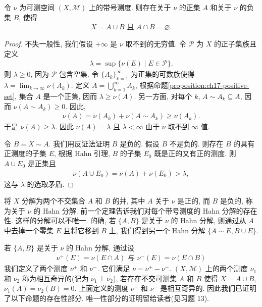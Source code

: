 \documentclass[../../main.tex]{subfiles}
\begin{document}
\begin{theorem}\label{theorem:ch17-hahn-decomposition}
令 $\nu$ 为可测空间 $(X,\mathcal{M})$ 上的带号测度. 则存在关于 $\nu$ 的正集 $A$ 和关于 $\nu$ 的负集 $B$, 使得
\begin{align*}
X=A\cup B\text{ 且 }A\cap B=\varnothing.
\end{align*}
\end{theorem}

\begin{proof}
不失一般性, 我们假设 $+\infty$ 是 $\nu$ 取不到的无穷值. 令 $\mathcal{P}$ 为 $X$ 的正子集族且定义
\begin{align*}
\lambda=\sup\{\nu(E)\mid E\in\mathcal{P}\}.
\end{align*}
则 $\lambda\geqslant 0$, 因为 $\mathcal{P}$ 包含空集. 令 $\{A_{k}\}_{k=1}^{\infty}$ 为正集的可数族使得 $\lambda=\lim_{k\to\infty}\nu(A_{k})$. 定义 $A=\bigcup_{k=1}^{\infty}A_{k}$, 根据命题\cref{proposition:ch17-positive-set}, 集合 $A$ 是一个正集, 因而 $\lambda\geqslant\nu(A)$. 另一方面, 对每个 $k$, $A\sim A_{k}\subseteq A$, 因而 $\nu(A\sim A_{k})\geqslant 0$. 因此,
\begin{align*}
\nu(A)=\nu(A_{k})+\nu(A\sim A_{k})\geqslant\nu(A_{k}).
\end{align*}
于是 $\nu(A)\geqslant\lambda$. 因此 $\nu(A)=\lambda$ 且 $\lambda<\infty$ 由于 $\nu$ 取不到 $\infty$ 值.

令 $B=X\sim A$. 我们用反证法证明 $B$ 是负的. 假设 $B$ 不是负的. 则存在 $B$ 的具有正测度的子集 $E$, 根据 Hahn 引理, $B$ 的子集 $E_{0}$ 既是正的又有正的测度. 则 $A\cup E_{0}$ 是正集且
\begin{align*}
\nu(A\cup E_{0})=\nu(A)+\nu(E_{0})>\lambda,
\end{align*}
这与 $\lambda$ 的选取矛盾.
\end{proof}

将 $X$ 分解为两个不交集合 $A$ 和 $B$ 的并, 其中 $A$ 关于 $\nu$ 是正的, 而 $B$ 是负的, 称为关于 $\nu$ 的 Hahn 分解. 前一个定理告诉我们对每个带号测度的 Hahn 分解的存在性. 这样的分解可以不唯一. 的确, 若 $\{A,B\}$ 是关于 $\nu$ 的 Hahn 分解, 则通过从 $A$ 中去掉一个零集 $E$ 且将它移到 $B$ 上, 我们得到另一个 Hahn 分解 $\{A\sim E,B\cup E\}$.

若 $\{A,B\}$ 是关于 $\nu$ 的 Hahn 分解, 通过设
\begin{align*}
\nu^{+}(E)=\nu(E\cap A)\text{ 与 }\nu^{-}(E)=\nu(E\cap B)
\end{align*}
我们定义了两个测度 $\nu^{+}$ 和 $\nu^{-}$. 它们满足 $\nu=\nu^{+}-\nu^{-}$. $(X,\mathcal{M})$ 上的两个测度 $\nu_{1}$ 和 $\nu_{2}$ 称为相互奇异的(记为 $\nu_{1}\perp\nu_{2}$), 若存在不交可测集 $A$ 和 $B$ 使得 $X=A\cup B$, $\nu_{1}(A)=\nu_{2}(B)=0$. 上面定义的测度 $\nu^{+}$ 和 $\nu^{-}$ 是相互奇异的. 因此我们已证明了以下命题的存在性部分. 唯一性部分的证明留给读者(见习题 13).
\end{document}
